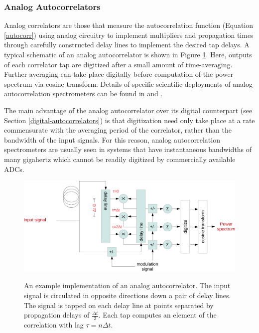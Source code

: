 \documentclass{ws-rv961x669}
\begin{document}
\subsubsection{Analog Autocorrelators}\label{analog-autocorrelators}

Analog correlators are those that measure the autocorrelation function (Equation \ref{autocorr}) using analog circuitry to implement multipliers and propagation times through carefully constructed delay lines to implement the desired tap delays.
A typical schematic of an analog autocorrelator is shown in Figure \ref{fig:analog-autocorr}. Here, outputs of each correlator tap are digitized after a small amount of time-averaging. Further averaging can take place digitally before computation of the power spectrum via cosine transform. Details of specific scientific deployments of analog autocorrelation spectrometers can be found in \cite{Erickson2007} and \cite{Harris1998}.

The main advantage of the analog autocorrelator over its digital counterpart (see Section \ref{digital-autocorrelators}) is that digitization need only take place at a rate commensurate with the averaging period of the correlator, rather than the bandwidth of the input signals. For this reason, analog autocorrelation spectrometers are usually seen in systems that have instantaneous bandwidths of many gigahertz which cannot be readily digitized by commercially available ADCs.


\begin{figure}
 \centering
 \includegraphics[width=\textwidth]{./figures/analog-autocorr-crop.pdf}
 \label{fig:analog-autocorr}
 \caption{An example implementation of an analog autocorrelator. The input signal is circulated in opposite directions down a pair of delay lines. The signal is tapped on each delay line at points separated by propagation delays of $\frac{\Delta t}{2}$. Each tap computes an element of the correlation with lag $\tau=n\Delta t$.}
\end{figure}
\end{document}
